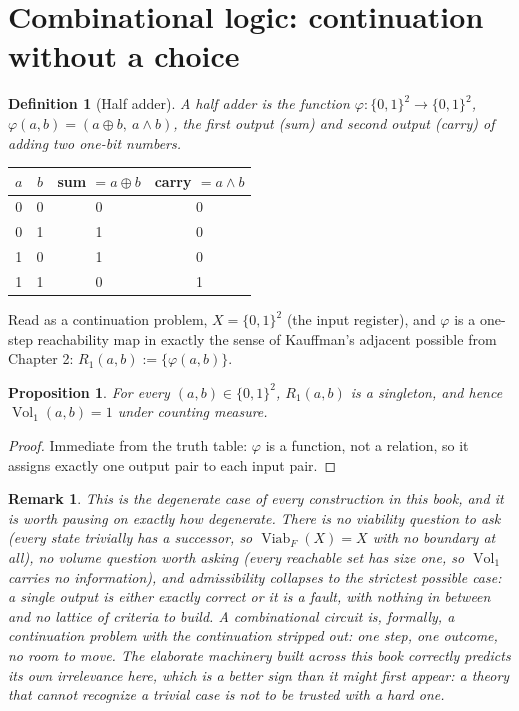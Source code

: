 \documentclass[11pt]{report}
\newtheorem{proposition}{Proposition}[chapter]
\newtheorem{definition}{Definition}[chapter]
\newtheorem{remark}{Remark}[chapter]
\begin{document}
\section*{Combinational logic: continuation without a choice}

\begin{definition}[Half adder]
A half adder is the function $\varphi : \{0,1\}^2 \to \{0,1\}^2$,
$\varphi(a,b) = (a \oplus b,\ a \wedge b)$, the first output (sum) and
second output (carry) of adding two one-bit numbers.
\end{definition}

\begin{center}
\begin{tabular}{|c|c||c|c|}
\hline
$a$ & $b$ & sum $= a \oplus b$ & carry $= a \wedge b$ \\
\hline
0 & 0 & 0 & 0 \\
0 & 1 & 1 & 0 \\
1 & 0 & 1 & 0 \\
1 & 1 & 0 & 1 \\
\hline
\end{tabular}
\end{center}

Read as a continuation problem, $X = \{0,1\}^2$ (the input register),
and $\varphi$ is a one-step reachability map in exactly the sense of
Kauffman's adjacent possible from Chapter 2:
$R_1(a,b) := \{\varphi(a,b)\}$.

\begin{proposition}
For every $(a,b) \in \{0,1\}^2$, $R_1(a,b)$ is a singleton, and hence
$\operatorname{Vol}_1(a,b) = 1$ under counting measure.
\end{proposition}
\begin{proof}
Immediate from the truth table: $\varphi$ is a function, not a
relation, so it assigns exactly one output pair to each input pair.
\end{proof}

\begin{remark}
This is the degenerate case of every construction in this book, and it
is worth pausing on exactly how degenerate. There is no viability
question to ask (every state trivially has a successor, so
$\operatorname{Viab}_F(X) = X$ with no boundary at all), no volume
question worth asking (every reachable set has size one, so
$\operatorname{Vol}_1$ carries no information), and admissibility
collapses to the strictest possible case: a single output is either
exactly correct or it is a fault, with nothing in between and no
lattice of criteria to build. A combinational circuit is, formally, a
continuation problem with the continuation stripped out: one step,
one outcome, no room to move. The elaborate machinery built across
this book correctly predicts its own irrelevance here, which is a
better sign than it might first appear: a theory that cannot recognize
a trivial case is not to be trusted with a hard one.
\end{remark}
\end{document}
